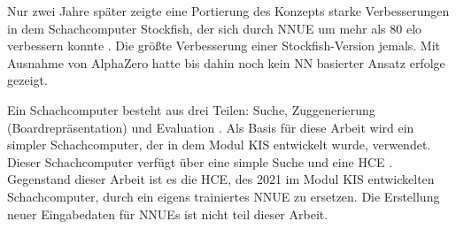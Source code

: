 Nur zwei Jahre später zeigte eine Portierung des Konzepts starke Verbesserungen in dem Schachcomputer Stockfish, der sich durch \ac{NNUE} um mehr als 80 elo verbessern konnte \cite{StockfishIntroducingNNUE}. Die größte Verbesserung einer Stockfish-Version jemals. Mit Ausnahme von AlphaZero \cite{Silver2017} hatte bis dahin noch kein \ac{NN} basierter Ansatz erfolge gezeigt.


Ein Schachcomputer besteht aus drei Teilen: Suche, Zuggenerierung (Boardrepräsentation) und Evaluation \cite{VazquezFernandez2013}. Als Basis für diese Arbeit wird ein simpler Schachcomputer, der in dem Modul \ac{KIS} entwickelt wurde, verwendet. Dieser Schachcomputer verfügt über eine simple Suche und eine \ac{HCE} \cite{nopy}. Gegenstand dieser Arbeit ist es die \ac{HCE}, des 2021 im Modul \ac{KIS} entwickelten Schachcomputer, durch ein eigens trainiertes \ac{NNUE} zu ersetzen. Die Erstellung neuer Eingabedaten für \acp{NNUE} ist nicht teil dieser Arbeit.